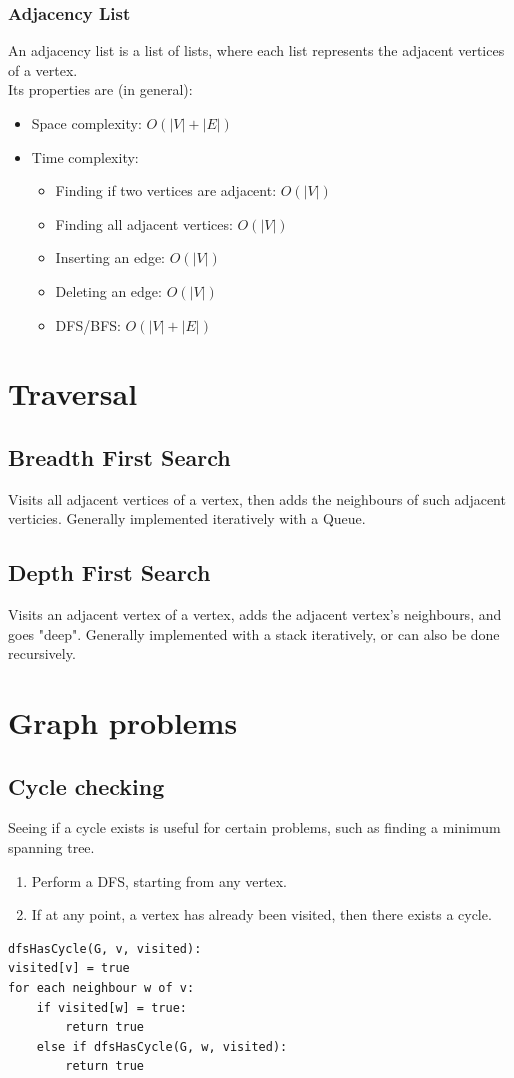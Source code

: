 \documentclass[14]{article}
\begin{document}
\subsubsection{Adjacency List}
An adjacency list is a list of lists, where each list represents the adjacent vertices of a vertex. \\ 
Its properties are (in general):
\begin{itemize}
    \item Space complexity: $O(|V| + |E|)$
    \item Time complexity: 
        \begin{itemize}
            \item Finding if two vertices are adjacent: $O(|V|)$
            \item Finding all adjacent vertices: $O(|V|)$
            \item Inserting an edge: $O(|V|)$
            \item Deleting an edge: $O(|V|)$
            \item DFS/BFS: $O(|V| + |E|)$
        \end{itemize}
\end{itemize}
\section{Traversal}
\subsection{Breadth First Search}
Visits all adjacent vertices of a vertex, then adds the neighbours of such adjacent verticies. Generally implemented
iteratively with a Queue.
\subsection{Depth First Search}
Visits an adjacent vertex of a vertex, adds the adjacent vertex's neighbours, and goes "deep". Generally implemented 
with a stack iteratively, or can also be done recursively.
\section{Graph problems}
\subsection{Cycle checking}
Seeing if a cycle exists is useful for certain problems, such as finding a minimum spanning tree.
\begin{enumerate}
    \item Perform a DFS, starting from any vertex.
    \item If at any point, a vertex has already been visited, then there exists a cycle.
\end{enumerate}
\begin{verbatim}
dfsHasCycle(G, v, visited):
visited[v] = true 
for each neighbour w of v:
    if visited[w] = true:
        return true
    else if dfsHasCycle(G, w, visited):
        return true
\end{verbatim}
\pagebreak
\end{document}
